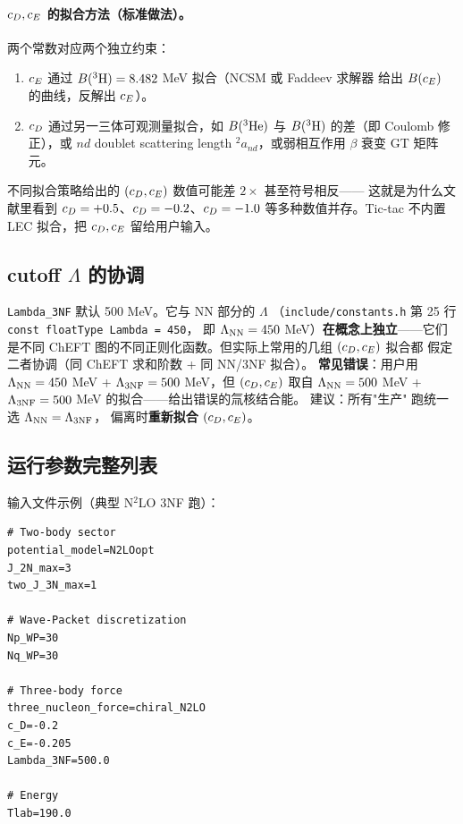 \paragraph{\(c_D, c_E\) 的拟合方法（标准做法）。}
两个常数对应两个独立约束：
\begin{enumerate}
  \item \(c_E\) 通过 \(B(^3{\rm H}) = 8.482\) MeV 拟合（NCSM 或 Faddeev 求解器
        给出 \(B(c_E)\) 的曲线，反解出 \(c_E\)）。
  \item \(c_D\) 通过另一三体可观测量拟合，如 \(B(^3{\rm He})\) 与 \(B(^3{\rm H})\)
        的差（即 Coulomb 修正），或 \(nd\) doublet scattering length
        \({}^2 a_{nd}\)，或弱相互作用 \(\beta\) 衰变 GT 矩阵元。
\end{enumerate}

不同拟合策略给出的 \((c_D, c_E)\) 数值可能差 \(2 \times\) 甚至符号相反——
这就是为什么文献里看到 \(c_D = +0.5\)、\(c_D = -0.2\)、\(c_D = -1.0\)
等多种数值并存。Tic-tac 不内置 LEC 拟合，把 \(c_D, c_E\) 留给用户输入。

\subsection{cutoff \(\Lambda\) 的协调}
\label{subsec:ch15-cutoff}

\texttt{Lambda\_3NF} 默认 500 MeV。它与 NN 部分的 \(\Lambda\)
（\texttt{include/constants.h} 第 25 行 \texttt{const floatType Lambda = 450}，
即 \(\Lambda_{\rm NN} = 450\) MeV）\textbf{在概念上独立}——它们是不同
ChEFT 图的不同正则化函数。但实际上常用的几组 \((c_D, c_E)\) 拟合都
假定二者协调（同 ChEFT 求和阶数 + 同 NN/3NF 拟合）。
\textbf{常见错误}：用户用 \(\Lambda_{\rm NN} = 450\) MeV + \(\Lambda_{\rm 3NF}
= 500\) MeV，但 \((c_D, c_E)\) 取自 \(\Lambda_{\rm NN} = 500\) MeV +
\(\Lambda_{\rm 3NF} = 500\) MeV 的拟合——给出错误的氚核结合能。
建议：所有"生产" 跑统一选 \(\Lambda_{\rm NN} = \Lambda_{\rm 3NF}\)，
偏离时\textbf{重新拟合} \((c_D, c_E)\)。

\subsection{运行参数完整列表}
\label{subsec:ch15-run-params}



输入文件示例（典型 N\(^2\)LO 3NF 跑）：
\begin{lstlisting}[style=config, caption={\texttt{CPP/Input/input\_3nf\_default.txt}（典型 3NF 输入）}, label={lst:ch15-input-example}]
# Two-body sector
potential_model=N2LOopt
J_2N_max=3
two_J_3N_max=1

# Wave-Packet discretization
Np_WP=30
Nq_WP=30

# Three-body force
three_nucleon_force=chiral_N2LO
c_D=-0.2
c_E=-0.205
Lambda_3NF=500.0

# Energy
Tlab=190.0
\end{lstlisting}

